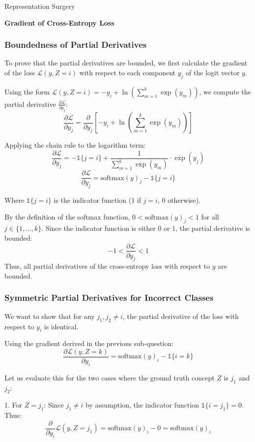 \begin{question}{Representation Surgery}
\begin{subquestion}{\textbf{Gradient of Cross-Entropy Loss}}
\subsubsection*{Boundedness of Partial Derivatives}

To prove that the partial derivatives are bounded, we first calculate the gradient of the loss $\mathcal{L}(y, Z=i)$ with respect to each component $y_j$ of the logit vector $y$.

Using the form $\mathcal{L}(y, Z=i) = -y_i + \ln\left(\sum_{m=1}^{k} \exp(y_m)\right)$, we compute the partial derivative $\frac{\partial \mathcal{L}}{\partial y_j}$:
$$\frac{\partial \mathcal{L}}{\partial y_j} = \frac{\partial}{\partial y_j} \left[ -y_i + \ln\left(\sum_{m=1}^{k} \exp(y_m)\right) \right]$$

Applying the chain rule to the logarithm term:
$$\frac{\partial \mathcal{L}}{\partial y_j} = -\mathbb{1}\{j=i\} + \frac{1}{\sum_{m=1}^{k} \exp(y_m)} \cdot \exp(y_j)$$
$$\frac{\partial \mathcal{L}}{\partial y_j} = \text{softmax}(y)_j - \mathbb{1}\{j=i\}$$

Where $\mathbb{1}\{j=i\}$ is the indicator function (1 if $j=i$, 0 otherwise). 

By the definition of the softmax function, $0 < \text{softmax}(y)_j < 1$ for all $j \in \{1, \dots, k\}$. Since the indicator function is either $0$ or $1$, the partial derivative is bounded:
$$-1 < \frac{\partial \mathcal{L}}{\partial y_j} < 1$$
Thus, all partial derivatives of the cross-entropy loss with respect to $y$ are bounded.

\subsubsection*{Symmetric Partial Derivatives for Incorrect Classes}

We want to show that for any $j_1, j_2 \neq i$, the partial derivative of the loss with respect to $y_i$ is identical. 

Using the gradient derived in the previous sub-question:
$$\frac{\partial \mathcal{L}(y, Z=k)}{\partial y_i} = \text{softmax}(y)_i - \mathbb{1}\{i=k\}$$

Let us evaluate this for the two cases where the ground truth concept $Z$ is $j_1$ and $j_2$:

1. For $Z = j_1$: 
Since $j_1 \neq i$ by assumption, the indicator function $\mathbb{1}\{i=j_1\} = 0$. Thus:
$$\frac{\partial}{\partial y_i} \mathcal{L}(y, Z=j_1) = \text{softmax}(y)_i - 0 = \text{softmax}(y)_i$$


\end{subquestion}
\end{question}
